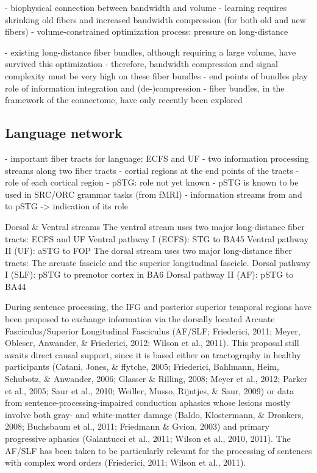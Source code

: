 - biophysical connection between bandwidth and volume
- learning requires shrinking old fibers and increased bandwidth compression (for both old and new fibers)
- volume-constrained optimization process: pressure on long-distance

- existing long-distance fiber bundles, although requiring a large volume, have survived this optimization
- therefore, bandwidth compression and signal complexity must be very high on these fiber bundles
- end points of bundles play role of information integration and (de-)compression
- fiber bundles, in the framework of the connectome, have only recently been explored


\subsection{Language network}
- important fiber tracts for language: ECFS and UF
- two information processing streams along two fiber tracts
- cortial regions at the end points of the tracts
- role of each cortical region
- pSTG: role not yet known
- pSTG is known to be used in SRC/ORC grammar tasks (from fMRI)
- information streams from and to pSTG -> indication of its role

Dorsal \& Ventral streams
The ventral stream uses two major long-distance fiber tracts: ECFS and UF
Ventral pathway I (ECFS): STG to BA45
Ventral pathway II (UF): aSTG to FOP
The dorsal stream uses two major long-distance fiber tracts: The arcuate fascicle and the superior longitudinal fascicle.
Dorsal pathway I (SLF): pSTG to premotor cortex in BA6
Dorsal pathway II (AF): pSTG to BA44

During sentence processing, the IFG and posterior superior temporal regions have been proposed to exchange information via
 the dorsally located Arcuate Fasciculus/Superior Longitudinal Fasciculus (AF/SLF; Friederici, 2011; Meyer, Obleser, Anwander, \& Friederici, 2012; Wilson et al., 2011). This proposal still awaits direct causal support, since it is based either on tractography in healthy participants (Catani, Jones, \& ffytche, 2005; Friederici, Bahlmann, Heim, Schubotz, \& Anwander, 2006; Glasser \& Rilling, 2008; Meyer et al., 2012; Parker et al., 2005; Saur et al., 2010; Weiller, Musso, Rijntjes, \& Saur, 2009) or data from sentence-processing-impaired conduction aphasics whose lesions mostly involve both gray- and white-matter damage (Baldo, Klostermann, \& Dronkers, 2008; Buchsbaum et al., 2011; Friedmann \& Gvion, 2003) and primary progressive aphasics (Galantucci et al., 2011; Wilson et al., 2010, 2011). The AF/SLF has been taken to be particularly relevant for the
 processing of sentences with complex word orders (Friederici,
 2011; Wilson et al., 2011).

